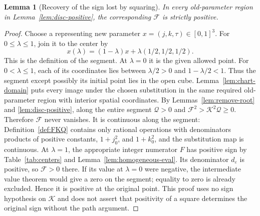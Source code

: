 \documentclass[11pt,a4paper]{article}
\newtheorem{lemma}{Lemma}[section]
\theoremstyle{definition}
\newcommand{\E}[2]{\refstepcounter{equation}\[#2\tag{\theequation}\label{eq:#1}\]}
\begin{document}
\begin{lemma}[Recovery of the sign lost by squaring]\label{lem:Fpositive}
In every old-parameter region in Lemma~\ref{lem:disc-positive}, the corresponding $\mathcal F$ is strictly positive.
\end{lemma}
\begin{proof}
Choose a representing new parameter $x=(j,k,\tau)\in[0,1]^3$. For $0\leq\lambda\leq1$, join it to the center by
\E{center-path}{x(\lambda)=(1-\lambda)x+\lambda(1/2,1/2,1/2).}
This is the definition of the segment. At $\lambda=0$ it is the given allowed point. For $0<\lambda\leq1$, each of its coordinates lies between $\lambda/2>0$ and $1-\lambda/2<1$. Thus the segment except possibly its initial point lies in the open cube. Lemma~\ref{lem:chart-domain} puts every image under the chosen substitution in the same required old-parameter region with interior spatial coordinates.
By Lemmas~\ref{lem:remove-root} and \ref{lem:disc-positive}, along the entire segment $\mathcal Q>0$ and $\mathcal F^2>\mathcal K^2\mathcal Q\geq0$. Therefore $\mathcal F$ never vanishes. It is continuous along the segment: Definition~\ref{def:FKQ} contains only rational operations with denominators products of positive constants, $1+j_0^2$, and $1+k_0^2$, and the substitution map is continuous.
At $\lambda=1$, the appropriate integer numerator $F$ has positive sign by Table~\ref{tab:centers} and Lemma~\ref{lem:homogeneous-eval}. Its denominator $d_\varepsilon$ is positive, so $\mathcal F>0$ there. If its value at $\lambda=0$ were negative, the intermediate value theorem would give a zero on the segment; equality to zero is already excluded. Hence it is positive at the original point.
This proof uses no sign hypothesis on $\mathcal K$ and does not assert that positivity of a square determines the original sign without the path argument.
\end{proof}
\end{document}
